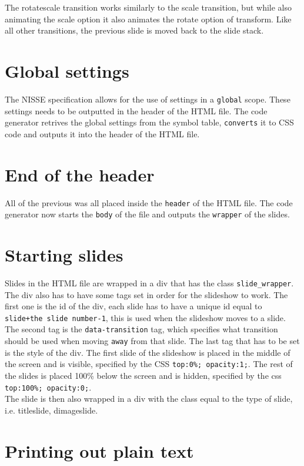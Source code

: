 The rotatescale transition works similarly to the scale transition, but while also animating the scale option it also animates the rotate option of transform. Like all other transitions, the previous slide is moved back to the slide stack.\\

\section{Global settings}
The NISSE specification allows for the use of settings in a \texttt{global} scope. These settings needs to be outputted in the header of the HTML file. The code generator retrives the global settings from the symbol table, \texttt{converts} it to CSS code and outputs it into the header of the HTML file.

\section{End of the header}
All of the previous was all placed inside the \texttt{header} of the HTML file. The code generator now starts the \texttt{body} of the file and outputs the \texttt{wrapper} of the slides.

\section{Starting slides}
Slides in the HTML file are wrapped in a div that has the class \texttt{slide\_wrapper}. The div also has to have some tags set in order for the slideshow to work. The first one is the id of the div, each slide has to have a unique id equal to \texttt{slide+the slide number-1}, this is used when the slideshow moves to a slide. The second tag is the \texttt{data-transition} tag, which specifies what transition should be used when moving \texttt{away} from that slide. The last tag that has to be set is the style of the div. The first slide of the slideshow is placed in the middle of the screen and is visible, specified by the CSS \texttt{top:0\%; opacity:1;}. The rest of the slides is placed 100\% below the screen and is hidden, specified by the css \texttt{top:100\%; opacity:0;}. \\
The slide is then also wrapped in a div with the class equal to the type of slide, i.e. titleslide, dimageslide.

\section{Printing out plain text}
